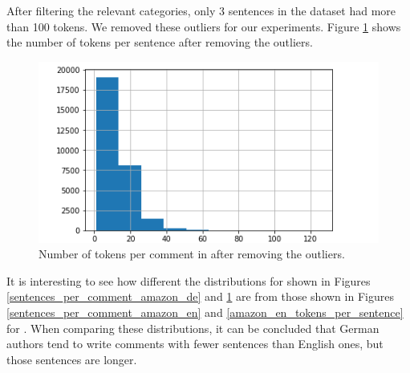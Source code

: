 After filtering the relevant categories, only 3 sentences in the dataset had more than 100 tokens. We removed these outliers for our experiments. Figure \ref{amazon_de_tokens_per_sentence} shows the number of tokens per sentence after removing the outliers.\\
\begin{figure}[h]
\centerline{\includegraphics[scale=.5]{images/tokens_per_sentence_amazon_de_after.png}}
\caption{Number of tokens per comment in \dataDE after removing the outliers.}
\label{amazon_de_tokens_per_sentence}
\end{figure}
It is interesting to see how different the distributions for \dataDE  shown in Figures \ref{sentences_per_comment_amazon_de} and \ref{amazon_de_tokens_per_sentence} are from those shown in Figures \ref{sentences_per_comment_amazon_en} and \ref{amazon_en_tokens_per_sentence} for \dataEN. When comparing these distributions, it can be concluded that German authors tend to write comments with fewer sentences than English ones, but those sentences are longer.
